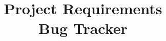 \documentclass[10pt,a4paper]{article}
\title{Project Requirements\\ \Large Bug Tracker}
\author{\vspace{6ex}}
\begin{document}
\maketitle

\newcommand{\p}{
\paragraph{} 
}
\newcommand{\ind}{
\indent
}
\newcommand{\q}{\item}
\newcommand{\tb}[1]{\textbf{#1}}
\newcommand{\field}[1]{\begin{tabular}{c}
#1
\end{tabular}}

\newcommand{\use}[9]{
\begin{tabular}{|c|c|}
\hline
Name of use case: & \tb{#1}\\
\hline
\field{Created by:\\ Alexandru Manafu} & \field{Date Created:\\ #2}\\
\hline
\end{tabular}

\noindent \begin{tabular}{|c|p{0.8\textwidth}|}
\hline
Description: &\vspace{0.1ex} #3.\\
\hline
Actors: &\vspace{0.1ex} #4\\
\hline
Preconditions: &\vspace{-3ex} #5\\
\hline
Postconditions: & \vspace{-3ex} #6\\
\hline
Flow: & \vspace{-3ex} #7\\
\hline
Altervative Flows: & \vspace{-3ex} #8\\
\hline
Requirements: & \vspace{-3ex} #9\\
\hline
\end{tabular}
}

\newcommand{\newp}{\newpage\noindent\hspace{-0.8ex}}

\tableofcontents
\end{document}
